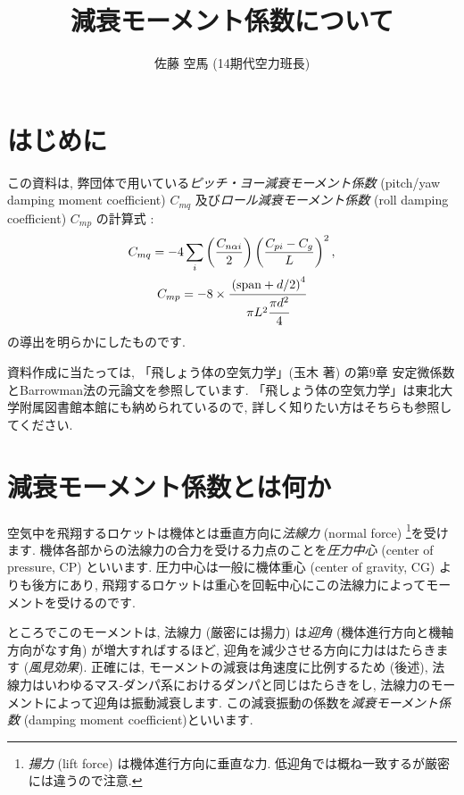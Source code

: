 \documentclass[uplatex,dvipdfmx,a4j,11  pt]{jsarticle}
\title{減衰モーメント係数について}
\date{}
\author{佐藤 空馬 (14期代空力班長)}
\begin{document}
\maketitle
\thispagestyle{mypagestyle}%
\setcounter{section}{-1}
\section{はじめに}
この資料は, 弊団体で用いている\emph{ピッチ・ヨー減衰モーメント係数} (pitch/yaw damping moment coefficient) $C_{mq}$ 及び\emph{ロール減衰モーメント係数} (roll damping coefficient) $C_{mp}$ の計算式 : 
\begin{gather}
  C_{mq} = - 4 \sum_i \left(\frac{C_{n\alpha i}}{2}\right)\left(\frac{C_{pi} - C_{g}}{L}\right)^2,\label{pitch_damping_coef}\\
  C_{mp} = - 8 \times \cfrac{\left(\mathrm{span} + d/2\right)^4}{\pi L^2 \cfrac{\pi d^2}{4}} \label{roll_damping_coef}
\end{gather}
の導出を明らかにしたものです.

資料作成に当たっては, 「飛しょう体の空気力学」(玉木 著) \cite{aerodynamics}の第9章 安定微係数とBarrowman法の元論文\cite{barrowman}を参照しています.
「飛しょう体の空気力学」は東北大学附属図書館本館にも納められているので, 詳しく知りたい方はそちらも参照してください.

\section{減衰モーメント係数とは何か}
空気中を飛翔するロケットは機体とは垂直方向に\emph{法線力} (normal force) \footnote{\emph{揚力} (lift force) は機体進行方向に垂直な力. 低迎角では概ね一致するが厳密には違うので注意.}を受けます.
機体各部からの法線力の合力を受ける力点のことを\emph{圧力中心} (center of pressure, CP) といいます.
圧力中心は一般に機体重心 (center of gravity, CG) よりも後方にあり, 飛翔するロケットは重心を回転中心にこの法線力によってモーメントを受けるのです.

ところでこのモーメントは, 法線力 (厳密には揚力) は\emph{迎角} (機体進行方向と機軸方向がなす角) が増大すればするほど, 迎角を減少させる方向に力ははたらきます (\emph{風見効果}).
正確には, モーメントの減衰は角速度に比例するため (後述), 法線力はいわゆるマス-ダンパ系におけるダンパと同じはたらきをし, 法線力のモーメントによって迎角は振動減衰します.
この減衰振動の係数を\emph{減衰モーメント係数} (damping moment coefficient)といいます.
\end{document}
